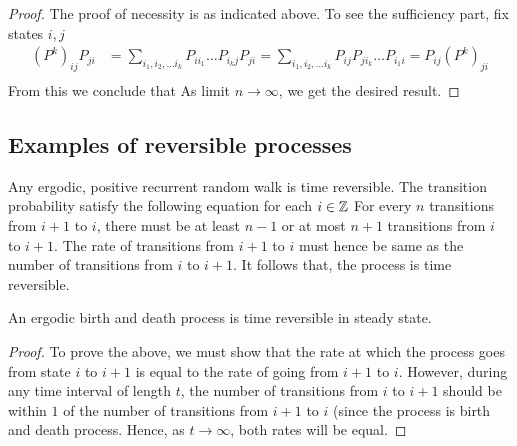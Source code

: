 \documentclass[a4paper,10pt,english]{article}
\begin{document}
\begin{proof}
The proof of necessity is as indicated above. To see the sufficiency part, fix states $i,j$
\begin{align*}
(P^k)_{ij}P_{ji}& = \sum_{i_1,i_2,\hdots i_{k}}P_{ii_1}\hdots P_{i_kj}P_{ji}=\sum_{i_1,i_2,\hdots i_{k}}P_{ij}P_{ji_k}\hdots P_{i_1 i}=P_{ij}(P^k)_{ji}\\
\end{align*}
From this we conclude that
As limit $n \rightarrow \infty$, we get the desired result.
\end{proof}

\subsection{Examples of reversible processes}
\begin{shaded*}
\begin{exmp*} 
Any ergodic, positive recurrent random walk is time reversible. 
The transition probability satisfy the following equation for each $i \in \mathbb{Z}$
 For every $n$ transitions from $i+1$ to $i$, there must be at least $n-1$ or at most $n+1$ transitions from $i$ to $i+1$. 
The rate of transitions from $i+1$ to $i$ must hence be same as the number of transitions from $i$ to $i+1$. 
It follows that, the process is time reversible.
\end{exmp*}
\end{shaded*}

\begin{prop}
An ergodic birth and death process is time reversible in steady state.
\end{prop}
\begin{proof}
To prove the above, we must show that the rate at which the process goes from state $i$ to $i+1$ is equal to the rate of going from $i+1$ to $i$. 
However, during any time interval of length $t$, the number of transitions from $i$ to $i+1$ should be within $1$ of the number of transitions from $i+1$ to $i$ (since the process is birth and death process. 
Hence, as $t \to \infty$,  both rates will be equal. 
\end{proof}
\end{document}
